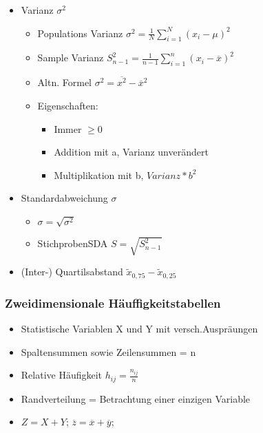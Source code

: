 \documentclass[a4paper]{article}
\begin{document}
\begin{landscape}
\begin{multicols}{4}
\begin{itemize}[noitemsep,nolistsep,leftmargin=*]
\begin{itemize}[noitemsep,nolistsep,leftmargin=*]
        \end{itemize}
        \item Varianz $\sigma^2$
        \begin{itemize}[noitemsep,nolistsep,leftmargin=*]
            \item Populations Varianz $\sigma^2 = \frac{1}{N} \displaystyle\sum_{i=1}^{N}(x_i - \mu)^2$
            \item Sample Varianz $S^2_{n-1} = \frac{1}{n-1}\displaystyle\sum_{i=1}^{n}(x_i - \overline{x})^2$
            \item Altn. Formel $\sigma^2 = \overline{x^2} - \overline{x}^2$
            \item Eigenschaften:
                \begin{itemize}[noitemsep,nolistsep,leftmargin=*]
                    \item Immer $ \geq 0$
                    \item Addition mit a, Varianz unverändert
                    \item Multiplikation mit b, $Varianz * b^2$
                \end{itemize}
        \end{itemize}
        \item Standardabweichung $\sigma$
        \begin{itemize}[noitemsep,nolistsep,leftmargin=*]
            \item $\sigma = \sqrt{\sigma^2}$
            \item StichprobenSDA $S = \sqrt{S^2_{n-1}}$
        \end{itemize}
        \item (Inter-) Quartilsabstand $\widetilde{x}_{0,75} - \widetilde{x}_{0,25}$
    \end{itemize}

    \subsubsection*{Zweidimensionale Häuffigkeitstabellen}
    \begin{itemize}[noitemsep,nolistsep,leftmargin=*]
        \item Statistische Variablen X und Y mit versch.Auspräungen
        \item Spaltensummen sowie Zeilensummen = n
        \item Relative Häufigkeit $h_{ij} = \frac{n_{ij}}{n}$
        \item Randverteilung = Betrachtung einer einzigen Variable
        \item $ Z = X +Y$; $\overline{z} = \overline{x} + \overline{y}$; 
    \end{itemize}


\end{multicols}
\end{landscape}
\end{document}

